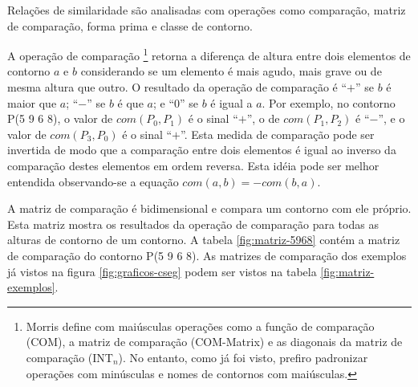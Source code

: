 Relações de similaridade \cite{marvin.ea87:relating} são analisadas
com operações como comparação, matriz de comparação, forma prima e
classe de contorno.

A operação de comparação \footnote{Morris define com
  maiúsculas operações como a função de comparação (COM), a matriz de
  comparação (COM-Matrix) e as diagonais da matriz de comparação
  (INT$_n$). No entanto, como já foi visto, prefiro padronizar
  operações com minúsculas e nomes de contornos com maiúsculas.}
retorna a diferença de altura entre dois elementos de contorno $a$ e
$b$ considerando se um elemento é mais agudo, mais grave ou de mesma
altura que outro. O resultado da operação de comparação é ``$+$'' se
$b$ é maior que $a$; ``$-$'' se $b$ é que $a$; e ``$0$'' se $b$ é
igual a $a$. Por exemplo, no contorno P(5 9 6 8), o valor de
$com(P_0,P_1)$ é o sinal ``$+$'', o de $com(P_1,P_2)$ é ``$-$'', e o
valor de $com(P_3,P_0)$ é o sinal ``$+$''. Esta medida de comparação
pode ser invertida de modo que a comparação entre dois elementos é
igual ao inverso da comparação destes elementos em ordem reversa. Esta
idéia pode ser melhor entendida observando-se a equação
$com(a,b)=-com(b,a)$.

A matriz de comparação é bidimensional e compara um contorno com ele
próprio. Esta matriz mostra os resultados da operação de comparação
para todas as alturas de contorno de um contorno. A tabela
\ref{fig:matriz-5968} contém a matriz de comparação do contorno P(5 9
6 8). As matrizes de comparação dos exemplos já vistos na figura
\ref{fig:graficos-cseg} podem ser vistos na tabela
\ref{fig:matriz-exemplos}.

